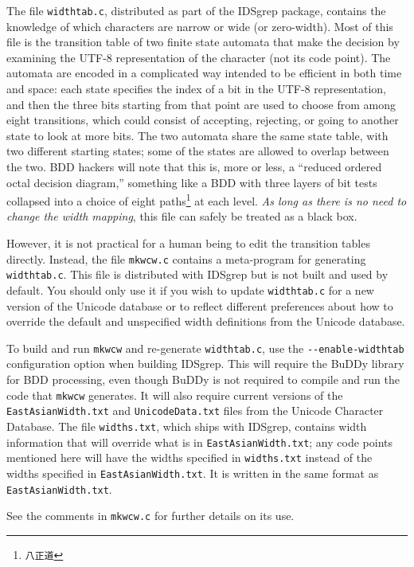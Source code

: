 \documentclass[twocolumn]{report}
\begin{document}
The file \texttt{widthtab.c}, distributed as part of the IDSgrep package,
contains the knowledge of which characters are narrow or wide (or
zero-width).  Most of this file is the transition table of two finite state
automata that make the decision by examining the UTF-8 representation of the
character (not its code point).  The automata are encoded in a complicated
way intended to be efficient in both time and space: each state specifies
the index of a bit in the UTF-8 representation, and then the three bits
starting from that point are used to choose from among eight transitions,
which could consist of accepting, rejecting, or going to another state to
look at more bits.  The two automata share the same state table, with two
different starting states; some of the states are allowed to overlap between
the two.  BDD hackers will note that this is, more or less, a ``reduced
ordered octal decision diagram,'' something like a BDD with three layers of
bit tests collapsed into a choice of eight paths\footnote{\texttt{八正道}}
at each level.  \emph{As long as there is no need to change the width
mapping}, this file can safely be treated as a black box.

However, it is not practical for a human being to edit the
transition tables directly.  Instead, the file \texttt{mkwcw.c} contains a
meta-program for generating \texttt{widthtab.c}.  This file is distributed
with IDSgrep but is not built and used by default.  You should only use it
if you wish to update \texttt{widthtab.c} for a new version of the Unicode
database or to reflect different preferences about how to override the
default and unspecified width definitions from the Unicode database.

To build and run \texttt{mkwcw} and re-generate \texttt{widthtab.c}, use the
\texttt{-{}-enable-widthtab} configuration option when building IDSgrep. 
This will require the BuDDy library for BDD processing, even
though BuDDy is not required to compile and run the code that
\texttt{mkwcw} generates.  It will also require current versions of
the \texttt{EastAsianWidth.txt} and \texttt{UnicodeData.txt} files from the
Unicode Character Database.  The file \texttt{widths.txt}, which ships with
IDSgrep, contains width information that will override what is in
\texttt{EastAsianWidth.txt}; any code points mentioned here will have the
widths specified in \texttt{widths.txt} instead of the widths specified in
\texttt{EastAsianWidth.txt}.  It is written in the same format as
\texttt{EastAsianWidth.txt}.

See the comments in \texttt{mkwcw.c} for further details on its use.
\end{document}
